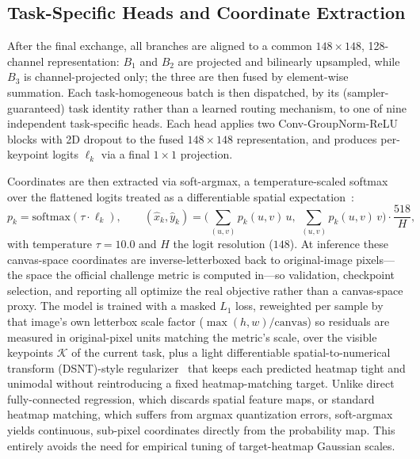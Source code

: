 \documentclass[runningheads]{llncs}
\begin{document}
\subsection{Task-Specific Heads and Coordinate Extraction}
After the final exchange, all branches are aligned to a common $148\times148$, 128-channel representation: $B_1$ and $B_2$ are projected and bilinearly upsampled, while $B_3$ is channel-projected only; the three are then fused by element-wise summation. Each task-homogeneous batch is then dispatched, by its (sampler-guaranteed) task identity rather than a learned routing mechanism, to one of nine independent task-specific heads. Each head applies two Conv-GroupNorm-ReLU blocks with 2D dropout to the fused $148\times148$ representation, and produces per-keypoint logits $\ell_k$ via a final $1\times1$ projection.

Coordinates are then extracted via soft-argmax, a temperature-scaled softmax over the flattened logits treated as a differentiable spatial expectation~\cite{nibali2018numerical}:
\begin{equation}
p_k = \text{softmax}(\tau \cdot \ell_k), \qquad
(\hat{x}_k, \hat{y}_k) = \Big(\sum_{(u,v)} p_k(u,v)\, u,\ \sum_{(u,v)} p_k(u,v)\, v\Big) \cdot \frac{518}{H},
\label{eq:softargmax}
\end{equation}
with temperature $\tau=10.0$ and $H$ the logit resolution ($148$). At inference these canvas-space coordinates are inverse-letterboxed back to original-image pixels---the space the official challenge metric is computed in---so validation, checkpoint selection, and reporting all optimize the real objective rather than a canvas-space proxy. The model is trained with a masked $L_1$ loss, reweighted per sample by that image's own letterbox scale factor ($\max(h,w)/\text{canvas}$) so residuals are measured in original-pixel units matching the metric's scale, over the visible keypoints $\mathcal{K}$ of the current task, plus a light differentiable spatial-to-numerical transform (DSNT)-style regularizer~\cite{nibali2018numerical} that keeps each predicted heatmap tight and unimodal without reintroducing a fixed heatmap-matching target. Unlike direct fully-connected regression, which discards spatial feature maps, or standard heatmap matching, which suffers from argmax quantization errors, soft-argmax yields continuous, sub-pixel coordinates directly from the probability map. This entirely avoids the need for empirical tuning of target-heatmap Gaussian scales.

\end{document}
